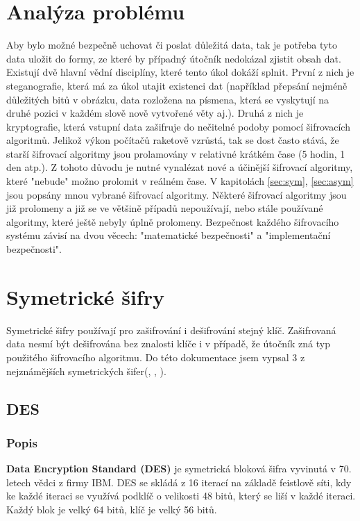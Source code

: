 \documentclass[12pt, a4paper]{article}
\begin{document}
\section{Analýza problému}
Aby bylo možné bezpečně uchovat či poslat důležitá data, tak je potřeba tyto data uložit do formy, ze které by případný útočník nedokázal zjistit obsah dat. Existují dvě hlavní vědní disciplíny, které tento úkol dokáží splnit. První z nich je steganografie, která má za úkol utajit existenci dat (například přepsání nejméně důležitých bitů v obrázku, data rozložena na písmena, která se vyskytují na druhé pozici v každém slově nově vytvořené věty aj.). Druhá z nich je kryptografie, která vstupní data zašifruje do nečitelné podoby pomocí šifrovacích algoritmů. Jelikož výkon počítačů raketově vzrůstá, tak se dost často stává, že starší šifrovací algoritmy jsou prolamovány v relativné krátkém čase (5 hodin, 1 den atp.). Z tohoto důvodu je nutné vynalézat nové a účinější šifrovací algoritmy, které "nebude" možno prolomit v reálném čase. V kapitolách \ref{sec:sym}, \ref{sec:asym} jsou popsány mnou vybrané šifrovací algoritmy. Některé šifrovací algoritmy jsou již prolomeny a již se ve většině případů nepoužívají, nebo stále používané algoritmy, které ještě nebyly úplně prolomeny. Bezpečnost každého šifrovacího systému závisí na dvou věcech: "matematické bezpečnosti" a "implementační bezpečnosti".

\section{Symetrické šifry}
Symetrické šifry používají pro zašifrování i dešifrování stejný klíč. Zašifrovaná data nesmí být dešifrována bez znalosti klíče i v případě, že útočník zná typ použitého šifrovacího algoritmu. Do této dokumentace jsem vypsal 3 z nejznámějších symetrických šifer(, , ).  
\label{sec:sym}
	\subsection{DES}
	\label{subsec:des}
		\subsubsection{Popis}
		\textbf{Data Encryption Standard (DES)} je symetrická bloková šifra vyvinutá v 70. letech vědci z firmy IBM. DES se skládá z 16 iterací na základě feistlově síti, kdy ke každé iteraci se využívá podklíč o velikosti 48 bitů, který se liší v každé iteraci. Každý blok je velký 64 bitů, klíč je velký 56 bitů.
\end{document}
